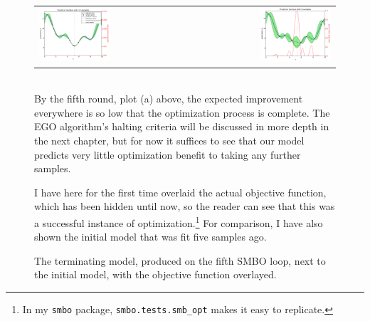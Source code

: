 \begin{figure}[h]
\centering
\begin{tabular}{lr}
\subcaptionbox{}
{\includegraphics[width=0.5\textwidth]{images/ego_ex/5}} &

\subcaptionbox{}
{\includegraphics[width=0.5\textwidth]{images/ego_ex/init_w_obj}} \\
\end{tabular}
\caption{The terminating model, produced on the fifth SMBO loop, next to the initial model, with the objective function overlayed.}
\label{fig:explore_exploit}

\begin{minipage}{\textwidth}
\ \\ By the fifth round, plot (a) above, the expected improvement everywhere is so low that the optimization process is complete. The EGO algorithm's halting criteria will be discussed in more depth in the next chapter, but for now it suffices to see that our model predicts very little optimization benefit to taking any further samples.

I have here for the first time overlaid the actual objective function, which has been hidden until now, so the reader can see that this was a successful instance of optimization.\footnote{In my \texttt{smbo} package, \texttt{smbo.tests.smb\_opt} makes it easy to replicate.} For comparison, I have also shown the initial model that was fit five samples ago.

\end{minipage}


\end{figure}









